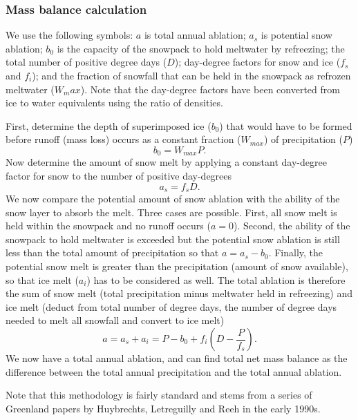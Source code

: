 \subsubsection{Mass balance calculation} 
%
We use the following symbols: $a$ is total annual ablation; $a_s$
is potential snow ablation; $b_0$ is the capacity of the snowpack
to hold meltwater by refreezing; the total number of positive
degree days ($D$); day-degree factors for snow and ice ($f_s$ and
$f_i$); and the fraction of snowfall that can be held in the
snowpack as refrozen meltwater ($W_max$). Note that the
day-degree factors have been converted from ice to water
equivalents using the ratio of densities.

 First,
determine the depth of superimposed ice ($b_0$) that would have to
be formed before runoff (mass loss) occurs as a constant fraction
($W_{max}$) of precipitation ($P$)
\begin{equation}
    b_0=W_{max} P.
\end{equation}
Now determine the amount of snow melt by applying a constant
day-degree factor for snow to the number of positive day-degrees
\begin{equation}
    a_s=f_s D.
\end{equation}
We now compare the potential amount of snow ablation with the
ability of the snow layer to absorb the melt.  Three cases are
possible. First, all snow melt is held within the snowpack and no
runoff occurs ($a=0$).  Second, the ability of the snowpack to
hold meltwater is exceeded but the potential snow ablation is
still less than the total amount of precipitation so that
$a=a_s-b_0$. Finally, the potential snow melt is greater than the
precipitation (amount of snow available), so that ice melt ($a_i$)
has to be considered as well.  The total ablation is therefore the
sum of snow melt (total precipitation minus meltwater held in
refreezing) and ice melt (deduct from total number of degree days,
the number of degree days needed to melt all snowfall and convert
to ice melt)
\begin{equation}
    a=a_s + a_i = P - b_0 + f_i \left( D-\frac{P}{f_s} \right).
\end{equation}
We now have a total annual ablation, and can find total net mass
balance as the difference between the total annual precipitation
and the total annual ablation.

Note that this methodology is fairly standard and stems from a
series of Greenland papers by Huybrechts, Letreguilly and Reeh in
the early 1990s.
%
%
%
